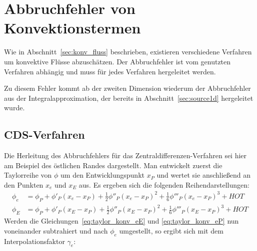 \section{Abbruchfehler von Konvektionstermen}

Wie in Abschnitt~\ref{sec:konv_fluss} beschrieben, existieren verschiedene Verfahren
um konvektive Flüsse abzuschätzen. Der Abbruchfehler ist vom genutzten Verfahren
abhängig und muss für jedes Verfahren hergeleitet werden.

Zu diesem Fehler kommt ab der zweiten Dimension wiederum der Abbruchfehler aus
der Integralapproximation, der bereits in Abschnitt~\ref{sec:source1d} hergeleitet wurde.

\subsection{CDS-Verfahren}
\label{sec:te_cds}

Die Herleitung des Abbruchfehlers für das Zentraldifferenzen-Verfahren sei hier am Beispiel des östlichen Randes dargestellt.
Man entwickelt zuerst die Taylorreihe von $\phi$ um den Entwicklungspunkt $x_P$ und wertet sie anschließend
an den Punkten $x_e$ und $x_E$ aus. Es ergeben sich die folgenden Reihendarstellungen:
\begin{align}
  \phi_e &= \phi_P + \phi'_P(x_e-x_P)+\frac{1}{2}\phi''_P(x_e-x_P)^2
  +\frac{1}{6}\phi'''_P(x_e-x_P)^3+HOT
  \label{eq:taylor_konv_eP}\\
  \phi_E &= \phi_P + \phi'_P(x_E-x_P)+\frac{1}{2}\phi''_P(x_E-x_P)^2
  +\frac{1}{6}\phi'''_P(x_E-x_P)^3+HOT
  \label{eq:taylor_konv_eE}
\end{align}
Werden die Gleichungen~\eqref{eq:taylor_konv_eE} und \eqref{eq:taylor_konv_eP} nun
voneinander subtrahiert und nach $\phi_e$ umgestellt, so ergibt sich mit dem
Interpolationsfaktor $\gamma_e$:

